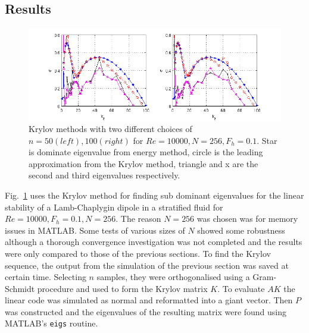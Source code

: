 \subsection{Results}
\begin{figure}
\begin{center}
\includegraphics[scale=0.7]{final_data.png}
\caption{Krylov methods with two different choices of $n=50 (left), 100 (right)$ for $Re=10000, N=256, F_{h}=0.1$. Star is dominate eigenvalue from energy method, circle is the leading approximation from the Krylov method, triangle and x are the second and third eigenvalues respectively.}
\label{krylov_tests}
\end{center} 
\end{figure}
Fig.~\ref{krylov_tests} uses the Krylov method for finding sub dominant eigenvalues for the linear stability of a Lamb-Chaplygin dipole in a stratified fluid for $Re=10000, F_{h}=0.1, N=256$. The reason $N=256$ was chosen was for memory issues in MATLAB. Some tests of various sizes of $N$ showed some robustness although a thorough convergence investigation was not completed and the results were only compared to those of the previous sections. To find the Krylov sequence, the output from the simulation of the previous section was saved at certain time.  Selecting $n$ samples, they were orthogonalised using a Gram-Schmidt procedure  and used to form the Krylov matrix $K$. To evaluate $AK$ the linear code was simulated as normal and reformatted into a giant vector. Then $P$ was constructed and the eigenvalues of the resulting matrix were found using MATLAB's \texttt{eigs} routine. 

